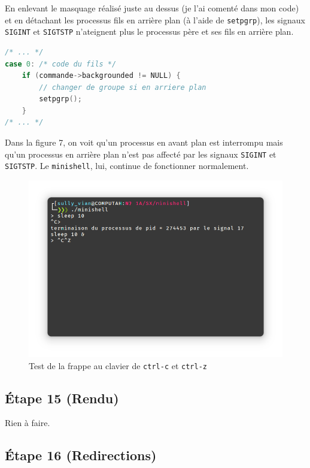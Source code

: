 \documentclass{article}
\begin{document}
En enlevant le masquage réalisé juste au dessus (je l'ai comenté dans mon code) et en détachant les processus fils en arrière plan (à l'aide de \texttt{setpgrp}), les signaux \texttt{SIGINT} et \texttt{SIGTSTP} n'ateignent plus le processus père et ses fils en arrière plan.

\begin{lstlisting}[language=C, caption=ajout de la question 14]
/* ... */
case 0: /* code du fils */
    if (commande->backgrounded != NULL) {
        // changer de groupe si en arriere plan
        setpgrp();
    }
/* ... */
\end{lstlisting}

Dans la figure 7, on voit qu'un processus en avant plan est interrompu mais qu'un processus en arrière plan n'est pas affecté par les signaux \texttt{SIGINT} et \texttt{SIGTSTP}. Le \texttt{minishell}, lui, continue de fonctionner normalement.

\begin{figure}[H]
    \centering
    \includegraphics[width=\textwidth]{./resources/E14.png}
    \caption{Test de la frappe au clavier de \texttt{ctrl-c} et \texttt{ctrl-z}}
    \label{fig:E14}
\end{figure}

\subsection*{Étape 15 (Rendu)}

Rien à faire.

\subsection*{Étape 16 (Redirections)}
\end{document}

